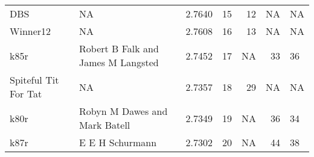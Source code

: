 \begin{tabular}{llrrrrl}
DBS                        &                                  NA &  2.7640 &    15 &            12 &             NA &              NA \\
Winner12                   &                                  NA &  2.7608 &    16 &            13 &             NA &              NA \\
k85r                       &  Robert B Falk and James M Langsted &  2.7452 &    17 &            NA &             33 &              36 \\
Spiteful Tit For Tat       &                                  NA &  2.7357 &    18 &            29 &             NA &              NA \\
k80r                       &       Robyn M Dawes and Mark Batell &  2.7349 &    19 &            NA &             36 &              34 \\
k87r                       &                     E E H Schurmann &  2.7302 &    20 &            NA &             44 &              38 \\
\bottomrule
\end{tabular}
